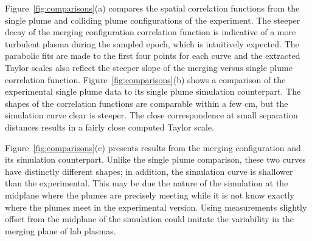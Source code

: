 \documentclass[aip,prl,amsmath,amssymb,reprint,superscriptaddress]{revtex4-1} %
\begin{document}
Figure~\ref{fig:comparisons}(a) compares the spatial correlation functions from the single plume and colliding plume configurations of the experiment. The steeper decay of the merging configuration correlation function is indicative of a more turbulent plasma during the sampled epoch, which is intuitively expected. The parabolic fits are made to the first four points for each curve and the extracted Taylor scales also reflect the steeper slope of the merging versus single plume correlation function. Figure~\ref{fig:comparisons}(b) shows a comparison of the experimental single plume data to its single plume simulation counterpart. The shapes of the correlation functions are comparable within a few cm, but the simulation curve clear is steeper. The close correspondence at small separation distances results in a fairly close computed Taylor scale.


Figure~\ref{fig:comparisons}(c) presents results from the merging configuration and its simulation counterpart. Unlike the single plume comparison, these two curves have distinctly different shapes; in addition, the simulation curve is shallower than the experimental. This may be due the nature of the simulation at the midplane where the plumes are precisely meeting while it is not know exactly where the plumes meet in the experimental version. Using measurements slightly offset from the midplane of the simulation could imitate the variability in the merging plane of lab plasmas.
\end{document}
